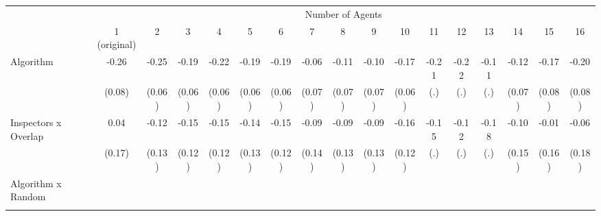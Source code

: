 \begin{tabular}{lcccccccccccccccc} \toprule
\multicolumn{1}{l}{} & \multicolumn{16}{c}{Number of Agents} \\\cmidrule(lr){2-17} \multicolumn{1}{l}{} & 1 (original) & 2 & 3 & 4 & 5 & 6 & 7 & 8 & 9 & 10 & 11 & 12 & 13 & 14 & 15 & 16 \\ \midrule
Algorithm   &       -0.26\sym{***}&       -0.25\sym{***}&       -0.19\sym{***}&       -0.22\sym{***}&       -0.19\sym{***}&       -0.19\sym{***}&       -0.06         &       -0.11         &       -0.10         &       -0.17\sym{***}&       -0.21         &       -0.22         &       -0.11         &       -0.12         &       -0.17\sym{**} &       -0.20\sym{**} \\
            &      (0.08)         &      (0.06)         &      (0.06)         &      (0.06)         &      (0.06)         &      (0.06)         &      (0.07)         &      (0.07)         &      (0.07)         &      (0.06)         &         (.)         &         (.)         &         (.)         &      (0.07)         &      (0.08)         &      (0.08)         \\
\addlinespace
Inspectors x Overlap&        0.04         &       -0.12         &       -0.15         &       -0.15         &       -0.14         &       -0.15         &       -0.09         &       -0.09         &       -0.09         &       -0.16         &       -0.15         &       -0.12         &       -0.18         &       -0.10         &       -0.01         &       -0.06         \\
            &      (0.17)         &      (0.13)         &      (0.12)         &      (0.12)         &      (0.13)         &      (0.12)         &      (0.14)         &      (0.13)         &      (0.13)         &      (0.12)         &         (.)         &         (.)         &         (.)         &      (0.15)         &      (0.16)         &      (0.18)         \\
\addlinespace
Algorithm x Random&                     &                     &                     &                     &                     &                     &                     &                     &                     &                     &                     &                     &                     &                     &                     &                     \\
            &                     &                     &                     &                     &                     &                     &                     &                     &                     &                     &                     &                     &                     &                     &                     &                     \\

\end{tabular}
